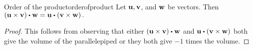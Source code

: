 \begin{proposition}{Order of the product}{orderofproduct}
Let ${\bf u},{\bf v}$, and ${\bf w}$ be vectors. Then $\left(
\vect{u}\times \vect{v}\right) \dotprod \vect{w}=\vect{u}\dotprod \left( \vect{v}\times \vect{w}
\right) .$
\end{proposition}

\begin{proof}This follows from observing that either 
$\left( \vect{u}\times \vect{v}\right) \dotprod \vect{w}$ and $\vect{u}\dotprod 
\left( \vect{v}\times \vect{w}\right) $ both give the volume of the parallelepiped or they both
give $-1$ times the volume.
\end{proof}

\begin{comment}
Recall that we can express the cross product as the determinant of a particular matrix. It turns out
that the same can be done for the box product. 
Suppose you have three vectors, $\vect{u}=\begin{mymatrix}{rrr}
a & b & c
\end{mymatrix}^T ,\vect{v}=\begin{mymatrix}{rrr}
 d & e & f
\end{mymatrix}^T ,$ and $\vect{w}=\begin{mymatrix}{rrr}
g & h & i
\end{mymatrix}^T .$ Then the box product $\vect{u}\dotprod \left(\vect{v}\times \vect{w}\right)$ is given by the following.
\begin{eqnarray*}
\vect{u}\dotprod \left(\vect{v}\times \vect{w}\right) &=&
\begin{mymatrix}{r}
a \\
b \\
c
\end{mymatrix} \dotprod \left|
\begin{array}{rrr}
\vect{i} & \vect{j} & \vect{k} \\
d & e & f \\
g & h & i
\end{array}
\right| \\
&=&a\left|
\begin{array}{rr}
e & f \\
h & i
\end{array}
\right| -b\left|
\begin{array}{rr}
d & f \\
g & i
\end{array}
\right| +c\left|
\begin{array}{rr}
d & e \\
g & h
\end{array}
\right| \\
&= &\det \begin{mymatrix}{rrr}
a & b & c \\
d & e & f \\
g & h & i
\end{mymatrix} 
\end{eqnarray*}


\end{comment}
